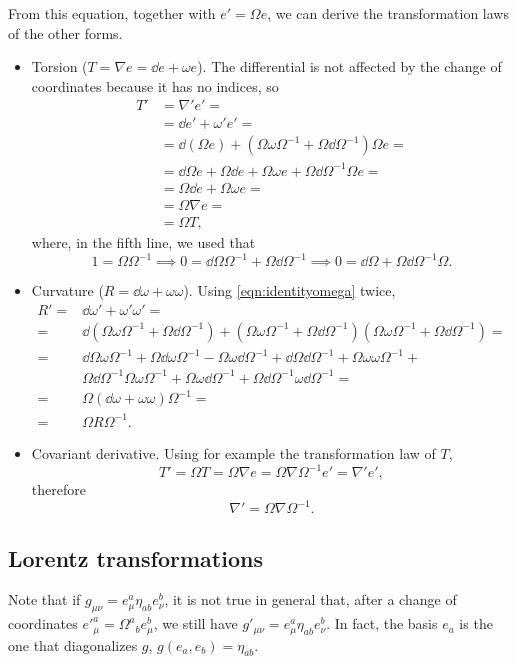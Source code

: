 \documentclass[a4paper,12pt]{book}
\begin{document}
From this equation, together with $e'=\Omega e$, we can derive the transformation laws of the other forms.
\begin{itemize}
\item Torsion ($T=\nabla e=\dd e+\omega e$). The differential is not affected by the change of coordinates because it has no indices, so
\begin{align*}
T'&=\nabla' e'=\\
&=\dd e'+\omega' e'=\\
&=\dd(\Omega e)+(\Omega\omega\Omega^{-1}+\Omega\dd\Omega^{-1})\Omega e=\\
&=\dd\Omega e+\Omega\dd e+\Omega\omega e+\Omega\dd\Omega^{-1}\Omega e=\\
&=\Omega\dd e+\Omega\omega e=\\
&=\Omega\nabla e=\\
&=\Omega T,
\end{align*}
where, in the fifth line, we used that
\begin{equation}
1=\Omega\Omega^{-1}\implies0=\dd\Omega\Omega^{-1}+\Omega\dd\Omega^{-1}\implies 0=\dd\Omega+\Omega\dd\Omega^{-1}\Omega.
\label{eqn:identityomega}
\end{equation}
\item Curvature ($R=\dd\omega+\omega\omega$). Using \cref{eqn:identityomega} twice,
\begin{align*}
R'=&\dd\omega'+\omega'\omega'=\\
=&\dd(\Omega\omega\Omega^{-1}+\Omega\dd\Omega^{-1})+(\Omega\omega\Omega^{-1}+\Omega\dd\Omega^{-1})(\Omega\omega\Omega^{-1}+\Omega\dd\Omega^{-1})=\\
=&\dd\Omega\omega\Omega^{-1}+\Omega\dd\omega\Omega^{-1}-\Omega\omega\dd\Omega^{-1}+\dd\Omega\dd\Omega^{-1}+\Omega\omega\omega\Omega^{-1}+\\
&\Omega\dd\Omega^{-1}\Omega\omega\Omega^{-1}+\Omega\omega\dd\Omega^{-1}+\Omega\dd\Omega^{-1}\omega\dd\Omega^{-1}=\\
=&\Omega(\dd\omega+\omega\omega)\Omega^{-1}=\\
=&\Omega R\Omega^{-1}.
\end{align*}
\item Covariant derivative. Using for example the transformation law of $T$,
\[T'=\Omega T=\Omega\nabla e=\Omega\nabla\Omega^{-1}e'=\nabla'e',\]
therefore
\[\nabla'=\Omega\nabla\Omega^{-1}.\]
\end{itemize}

\subsection{Lorentz transformations}
Note that if $g_{\mu\nu}=e_\mu^a\eta_{ab}e_\nu^b$, it is not true in general that, after a change of coordinates $e'^a_\mu=\Omega^a{}_be^b_\mu$, we still have $g'_{\mu\nu}=e^a_\mu\eta_{ab}e^b_\nu$. In fact, the basis $e_a$ is the one that diagonalizes $g$, $g(e_a,e_b)=\eta_{ab}$.
\end{document}
